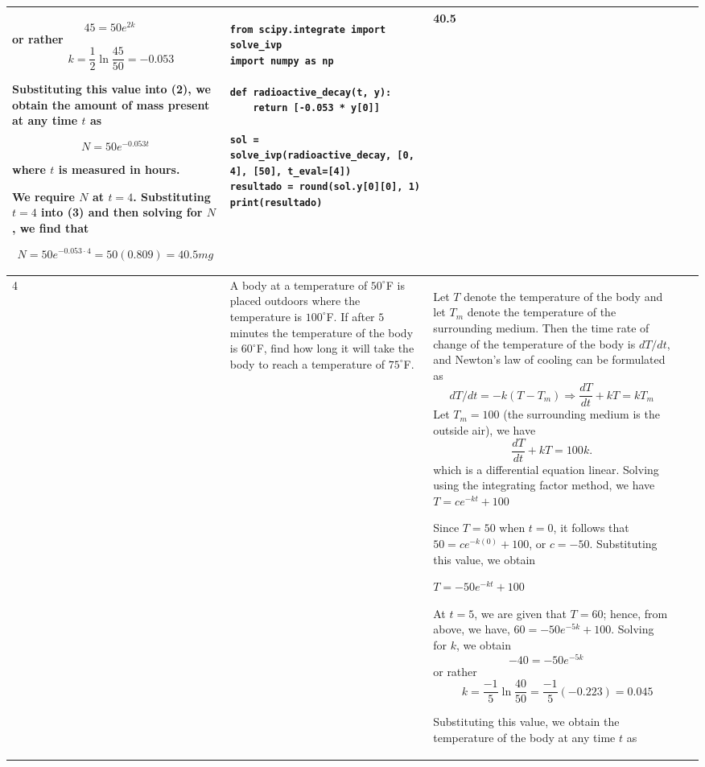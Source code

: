 \documentclass[a4paper,12pt]{article}
\begin{document}
\begin{longtable}{|p{0.3cm}|p{}|p{10cm}|p{}|p{1.5cm}|}
\[
45 = 50e^{2k} \quad \] or rather \[\quad k = \frac{1}{2} \ln \frac{45}{50} = -0.053
\]

Substituting this value into (2), we obtain the amount of mass present at any time \( t \) as

\[
N = 50 e^{-0.053t}
\]

where \( t \) is measured in hours.

We require \( N \) at \( t = 4 \). Substituting \( t = 4 \) into (3) and then solving for \( N \), we find that

\[
N = 50e^{-0.053 \cdot 4} = 50 (0.809) = 40.5 mg
\]

       & 
\begin{verbatim}
from scipy.integrate import solve_ivp
import numpy as np

def radioactive_decay(t, y):
    return [-0.053 * y[0]]

sol = solve_ivp(radioactive_decay, [0, 4], [50], t_eval=[4])
resultado = round(sol.y[0][0], 1)
print(resultado)
\end{verbatim}&    40.5              \\ \hline
       4          &   A body at a temperature of $50^\circ$F is placed outdoors where the temperature is $100^\circ$F. If after $5$ minutes the temperature of the body is $60^\circ$F, find how long it will take the body to reach a temperature of $75^\circ$F.

          & Let \( T \) denote the temperature of the body and let \( T_m \) denote the temperature of the surrounding medium. Then the time rate of change of the temperature of the body is \( dT/dt \), and Newton’s law of cooling can be formulated as  
\[
dT/dt = -k(T - T_m) \Rightarrow \frac{dT}{dt} + kT = kT_m
\]
Let  $T_m = 100$  (the surrounding medium is the outside air), we have
\[
\frac{dT}{dt} + kT = 100k.
\]
which is a  differential equation linear. Solving using the integrating factor method, we have
$T = ce^{-kt} + 100$

Since \( T = 50 \) when \( t = 0 \), it follows  that \( 50 = ce^{-k(0)} + 100 \), or \( c = -50 \). Substituting this value, we obtain

$T = -50e^{-kt} + 100$

At \( t = 5 \), we are given that \( T = 60 \); hence, from above, we have, \( 60 = -50e^{-5k} + 100 \). Solving for \( k \), we obtain
\[
-40 = -50e^{-5k} \quad\] or rather \[\quad k = \frac{-1}{5} \ln \frac{40}{50} = \frac{-1}{5}(-0.223) = 0.045
\]

Substituting this value, we obtain the temperature of the body at any time \( t \) as


\end{longtable}
\end{document}

